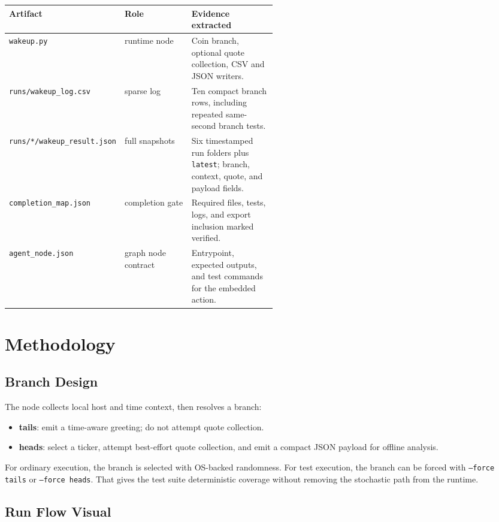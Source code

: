\documentclass[11pt,a4paper]{article}
\newcommand{\tighttable}{\renewcommand{\arraystretch}{1.16}\small}
\begin{document}
\tighttable
\begin{tabularx}{\linewidth}{@{}p{0.27\linewidth}p{0.25\linewidth}X@{}}
\toprule
Artifact & Role & Evidence extracted \\
\midrule
\texttt{wakeup.py} & runtime node &
Coin branch, optional quote collection, CSV and JSON writers. \\
\texttt{runs/wakeup\_log.csv} & sparse log &
Ten compact branch rows, including repeated same-second branch tests. \\
\texttt{runs/*/wakeup\_result.json} & full snapshots &
Six timestamped run folders plus \texttt{latest}; branch, context, quote, and payload fields. \\
\texttt{completion\_map.json} & completion gate &
Required files, tests, logs, and export inclusion marked verified. \\
\texttt{agent\_node.json} & graph node contract &
Entrypoint, expected outputs, and test commands for the embedded action. \\
\bottomrule
\end{tabularx}
\normalsize

\section{Methodology}

\subsection{Branch Design}

The node collects local host and time context, then resolves a branch:

\begin{itemize}
\item \textbf{tails}: emit a time-aware greeting; do not attempt quote collection.
\item \textbf{heads}: select a ticker, attempt best-effort quote collection,
and emit a compact JSON payload for offline analysis.
\end{itemize}

For ordinary execution, the branch is selected with OS-backed randomness. For
test execution, the branch can be forced with \texttt{--force tails} or
\texttt{--force heads}. That gives the test suite deterministic coverage
without removing the stochastic path from the runtime.

\subsection{Run Flow Visual}
\end{document}
